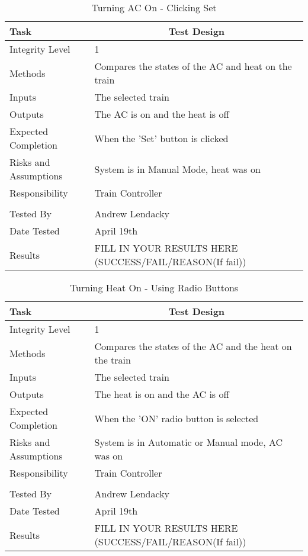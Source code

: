 \documentclass[]{article}
\begin{document}
\begin{table}[H]
	\centering
	\caption{Turning AC On - Clicking Set}
	\begin{tabular}{|l|l|}
		\hline
		Task & \multicolumn{1}{c|}{Test Design} \\ \hline
		Integrity Level & 1 \\ \hline
		Methods & Compares the states of the AC and heat on the train\\ \hline
		Inputs & The selected train\\ \hline
		Outputs & The AC is on and the heat is off \\ \hline
		Expected Completion & When the 'Set' button is clicked\\ \hline
		Risks and Assumptions & System is in Manual Mode, heat was on \\ \hline
		Responsibility &  Train Controller\\ \hline
			\\ \hline
		Tested By   &  Andrew Lendacky\\	\hline
		Date Tested & \parbox[t]{10cm}{April 19th}\\ \hline
		Results & FILL IN YOUR RESULTS HERE (SUCCESS/FAIL/REASON(If fail))\\ \hline
	\end{tabular}
\end{table}

\begin{table}[H]
	\centering
	\caption{Turning Heat On - Using Radio Buttons}
	\begin{tabular}{|l|l|}
		\hline
		Task & \multicolumn{1}{c|}{Test Design} \\ \hline
		Integrity Level & 1 \\ \hline
		Methods & Compares the states of the AC and the heat on the train\\ \hline
		Inputs & The selected train\\ \hline
		Outputs & The heat is on and the AC is off\\ \hline
		Expected Completion & When the 'ON' radio button is selected\\ \hline
		Risks and Assumptions & System is in Automatic or Manual mode, AC was on \\ \hline
		Responsibility &  Train Controller\\ \hline
			\\ \hline
		Tested By   &  Andrew Lendacky\\	\hline
		Date Tested & \parbox[t]{10cm}{April 19th}\\ \hline
		Results & FILL IN YOUR RESULTS HERE (SUCCESS/FAIL/REASON(If fail))\\ \hline
	\end{tabular}
\end{table}
\end{document}

